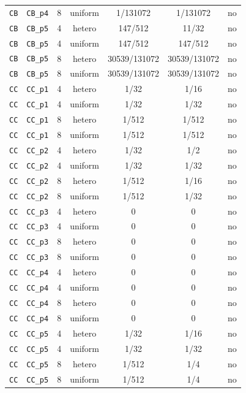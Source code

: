 \documentclass[11pt]{article}
\begin{document}
\begin{table}[ht]
\begin{tabular}{@{}lllcccc@{}}
\texttt{CB} & \texttt{CB\_p4} & 8 & uniform & 1/131072 & 1/131072 & no \\
\texttt{CB} & \texttt{CB\_p5} & 4 & hetero & 147/512 & 11/32 & no \\
\texttt{CB} & \texttt{CB\_p5} & 4 & uniform & 147/512 & 147/512 & no \\
\texttt{CB} & \texttt{CB\_p5} & 8 & hetero & 30539/131072 & 30539/131072 & no \\
\texttt{CB} & \texttt{CB\_p5} & 8 & uniform & 30539/131072 & 30539/131072 & no \\
\texttt{CC} & \texttt{CC\_p1} & 4 & hetero & 1/32 & 1/16 & no \\
\texttt{CC} & \texttt{CC\_p1} & 4 & uniform & 1/32 & 1/32 & no \\
\texttt{CC} & \texttt{CC\_p1} & 8 & hetero & 1/512 & 1/512 & no \\
\texttt{CC} & \texttt{CC\_p1} & 8 & uniform & 1/512 & 1/512 & no \\
\texttt{CC} & \texttt{CC\_p2} & 4 & hetero & 1/32 & 1/2 & no \\
\texttt{CC} & \texttt{CC\_p2} & 4 & uniform & 1/32 & 1/32 & no \\
\texttt{CC} & \texttt{CC\_p2} & 8 & hetero & 1/512 & 1/16 & no \\
\texttt{CC} & \texttt{CC\_p2} & 8 & uniform & 1/512 & 1/32 & no \\
\texttt{CC} & \texttt{CC\_p3} & 4 & hetero & 0 & 0 & no \\
\texttt{CC} & \texttt{CC\_p3} & 4 & uniform & 0 & 0 & no \\
\texttt{CC} & \texttt{CC\_p3} & 8 & hetero & 0 & 0 & no \\
\texttt{CC} & \texttt{CC\_p3} & 8 & uniform & 0 & 0 & no \\
\texttt{CC} & \texttt{CC\_p4} & 4 & hetero & 0 & 0 & no \\
\texttt{CC} & \texttt{CC\_p4} & 4 & uniform & 0 & 0 & no \\
\texttt{CC} & \texttt{CC\_p4} & 8 & hetero & 0 & 0 & no \\
\texttt{CC} & \texttt{CC\_p4} & 8 & uniform & 0 & 0 & no \\
\texttt{CC} & \texttt{CC\_p5} & 4 & hetero & 1/32 & 1/16 & no \\
\texttt{CC} & \texttt{CC\_p5} & 4 & uniform & 1/32 & 1/32 & no \\
\texttt{CC} & \texttt{CC\_p5} & 8 & hetero & 1/512 & 1/4 & no \\
\texttt{CC} & \texttt{CC\_p5} & 8 & uniform & 1/512 & 1/4 & no \\

\end{tabular}
\end{table}
\end{document}
